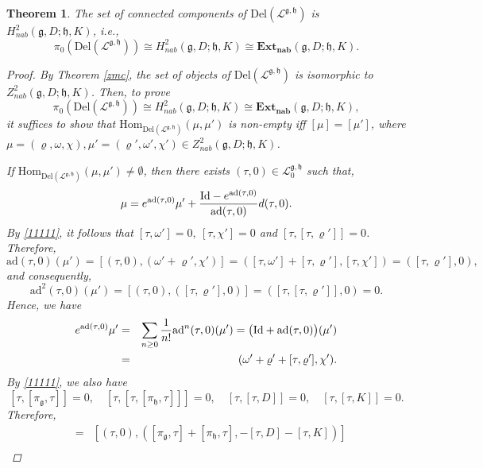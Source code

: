 \documentclass[12pt]{amsart}
\newtheorem{thm}{Theorem}[section]
\newcommand{\g}{\mathfrak g}
\newcommand{\h}{\mathfrak h}
\newcommand{\huaL}{\mathcal{L}}
\newcommand{\Id}{{\rm{Id}}}
\newcommand{\Hom}{\mathrm{Hom}}
\newcommand{\ad}{\mathrm{ad}}
\begin{document}
\begin{thm}
    The set of connected components of $\mathrm{Del}(\huaL^{\g, \h})$ is $H^2_{nab}(\g,D;\h, K)$, i.e.,
    $$
    \pi_0(\mathrm{Del}(\huaL^{\g, \h}))\cong H^2_{nab}(\g, D;\h, K)\cong\mathbf{Ext_{nab}}(\g,D;\h,K).
    $$
    \begin{proof}
       By Theorem \ref{zmc}, the set of objects of  $\mathrm{Del}(\huaL^{\g, \h})$ is isomorphic to $Z^{2}_{nab}(\g,D; \h,K)$. Then, to prove $$\pi_0(\mathrm{Del}(\huaL^{\g, \h}))\cong H^2_{nab}(\g,D; \h,K)\cong\mathbf{Ext_{nab}}(\g,D;\h,K),$$ it suffices to show that $\Hom_{\mathrm{Del}(\huaL^{\g, \h})}(\mu, \mu')$ is non-empty iff $[\mu]=[\mu']$, where
       $\mu=(\varrho, \omega, \chi), \mu'=(\varrho', \omega', \chi')\in Z^{2}_{nab}(\g,D; \h,K)$. 

        If $\Hom_{\mathrm{Del}(\huaL^{\g, \h})}(\mu, \mu')\neq \emptyset$, then there exists $(\tau,0)\in \huaL^{\g, \h}_{0}$ such that,
        \begin{equation}\label{mceq}
            \mu=e^{\ad(\tau,0)}\mu'+\frac{\Id-e^{\ad(\tau,0)}}{\ad(\tau,0)}d(\tau,0).
        \end{equation}
        By \eqref{11111}, it follows that $[\tau,\omega']=0,\ [\tau,\chi']=0$ and $[\tau,[\tau,\varrho']]=0$. Therefore, 
        \begin{equation*}
            \ad(\tau,0)(\mu')=[(\tau,0),(\omega'+\varrho',\chi')]=([\tau,\omega']+[\tau,\varrho'],[\tau,\chi'])=([\tau,\varrho'],0),
        \end{equation*}
        and consequently, $$\ad^{2}(\tau,0)(\mu')=[(\tau,0),([\tau,\varrho'],0)]=([\tau,[\tau,\varrho']],0)=0.$$
        Hence, we have
        \begin{eqnarray*}
            e^{\ad(\tau,0)}\mu'&=&\sum_{n\geq0}\frac{1}{n!}\ad^{n}(\tau,0)(\mu')%
            =\big(\Id+\ad(\tau,0)\big)(\mu')\\%
            &=&(\omega'+\varrho'+[\tau,\varrho'],\chi').
        \end{eqnarray*}
        By \eqref{11111}, we also have $$[\tau,[\pi_{\g},\tau]]=0, \quad [\tau, [\tau, [\pi_\h, \tau]]]=0,\quad [\tau,[\tau,D]]=0, \quad [\tau,[\tau,K]]=0.$$ Therefore,
        \begin{eqnarray*}
            [(\tau,0),d(\tau,0)]&=&[(\tau,0),([\pi_{\g},\tau]+[\pi_{\h},\tau],-[\tau,D]-[\tau,K])]\\

\end{eqnarray*}
\end{proof}
\end{thm}
\end{document}

